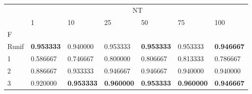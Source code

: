\begin{table}[htbp]
\centering
\label{iris-results}
\begin{tabular}{lllllll}
\toprule
 & \multicolumn{6}{c}{NT} \\
 & 1 & 10 & 25 & 50 & 75 & 100 \\
F &  &  &  &  &  &  \\
\midrule
Runif & \textbf{0.953333} & 0.940000 & 0.953333 & \textbf{0.953333} & 0.953333 & \textbf{0.946667} \\
1 & 0.586667 & 0.746667 & 0.800000 & 0.806667 & 0.813333 & 0.786667 \\
2 & 0.886667 & 0.933333 & 0.946667 & 0.946667 & 0.940000 & 0.940000 \\
3 & 0.920000 & \textbf{0.953333} & \textbf{0.960000} & \textbf{0.953333} & \textbf{0.960000} & \textbf{0.946667} \\
\bottomrule
\end{tabular}
\end{table}
